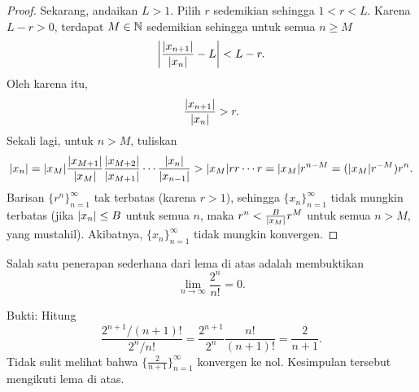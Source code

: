 \begin{proof}
Sekarang, andaikan $L > 1$.  Pilih
$r$ sedemikian sehingga $1 < r < L$.  Karena $L-r > 0$,
terdapat $M \in {\mathbb{N}}$ sedemikian sehingga untuk
semua $n \geq M$
\begin{equation*}
\left\lvert {\frac{\lvert {x_{n+1}} \rvert}{\lvert {x_n} \rvert} - L} \right\rvert < L-r .
\end{equation*}
Oleh karena itu,
\begin{equation*}
\frac{\lvert {x_{n+1}} \rvert}{\lvert {x_n} \rvert} > r .
\end{equation*}
Sekali lagi, untuk $n > M$,
tuliskan
\begin{equation*}
\lvert {x_n} \rvert =
\lvert {x_M} \rvert
\frac{\lvert {x_{M+1}} \rvert}{\lvert {x_{M}} \rvert}
\frac{\lvert {x_{M+2}} \rvert}{\lvert {x_{M+1}} \rvert}
\cdots
\frac{\lvert {x_{n}} \rvert}{\lvert {x_{n-1}} \rvert}
>
\lvert {x_M} \rvert
r r \cdots r = \lvert {x_M} \rvert r^{n-M} = (\lvert {x_M} \rvert r^{-M}) r^n .
\end{equation*}
Barisan $\{ r^n \}_{n=1}^\infty$ tak terbatas (karena $r > 1$), sehingga
$\{x_n\}_{n=1}^\infty$ tidak mungkin terbatas (jika $\lvert {x_n} \rvert \leq B$ untuk semua $n$, maka
$r^n < \frac{B}{\lvert {x_M} \rvert} r^{M}$ untuk semua $n > M$, yang mustahil).
Akibatnya, $\{ x_n \}_{n=1}^\infty$ tidak mungkin konvergen.
\end{proof}

\begin{example}
Salah satu penerapan sederhana dari lema di atas adalah membuktikan
\begin{equation*}
\lim_{n\to\infty} \frac{2^n}{n!} = 0 .
\end{equation*}

Bukti:
Hitung
\begin{equation*}
\frac{2^{n+1} / (n+1)!}{2^n/n!}
=
\frac{2^{n+1}}{2^n}\frac{n!}{(n+1)!}
=
\frac{2}{n+1} .
\end{equation*}
Tidak sulit melihat bahwa $\bigl\{ \frac{2}{n+1} \bigr\}_{n=1}^\infty$ konvergen ke nol.
Kesimpulan tersebut mengikuti lema di atas.
\end{example}

